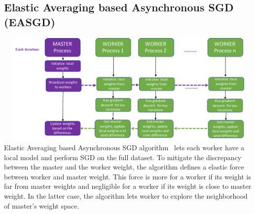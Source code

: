 \documentclass[12pt]{article}
\begin{document}
\subsection{Elastic Averaging based Asynchronous SGD (EASGD)}
{\centering\includegraphics[width=14cm, height=5.5cm]{images/asyncea_cstruct.pdf}} \\
Elastic Averaging based Asynchronous SGD algorithm~\cite{EA2015} lets each worker have a local model and perform SGD on the full dataset. To mitigate the discrepancy between the master and the worker weight, the algorithm defines a elastic force between worker and master weight. This force is more for a worker if its weight is far from master weights and negligible for a worker if its weight is close to master weight. In the latter case, the algorithm lets worker to explore the neighborhood of master's weight space. %
\end{document}
